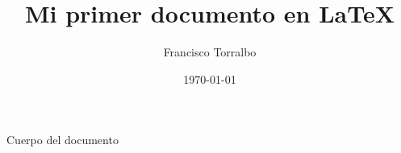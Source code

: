 \documentclass[a4paper, 12pt, twoside]{article}
\title{Mi primer documento en \LaTeX}
\author{Francisco Torralbo}
\date{\today}
\begin{document}
\maketitle

Cuerpo del documento
\end{document}
